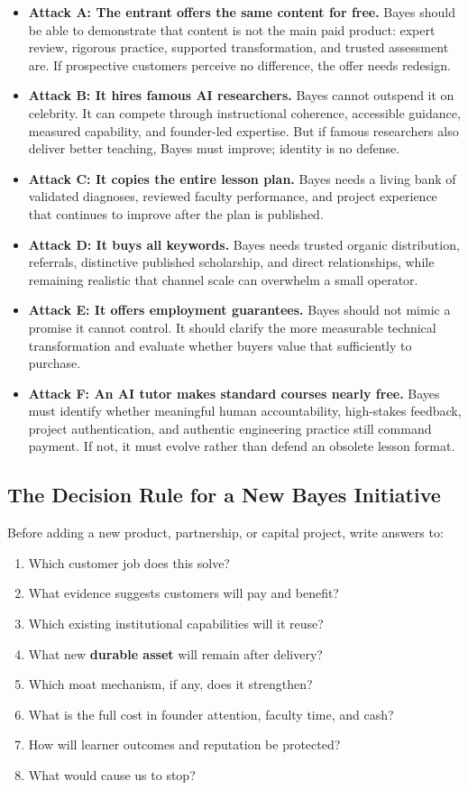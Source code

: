 \begin{itemize}
    \item \textbf{Attack A: The entrant offers the same content for free.} Bayes should be able to demonstrate that content is not the main paid product: expert review, rigorous practice, supported transformation, and trusted assessment are. If prospective customers perceive no difference, the offer needs redesign.
    \item \textbf{Attack B: It hires famous AI researchers.} Bayes cannot outspend it on celebrity. It can compete through instructional coherence, accessible guidance, measured capability, and founder-led expertise. But if famous researchers also deliver better teaching, Bayes must improve; identity is no defense.
    \item \textbf{Attack C: It copies the entire lesson plan.} Bayes needs a living bank of validated diagnoses, reviewed faculty performance, and project experience that continues to improve after the plan is published.
    \item \textbf{Attack D: It buys all keywords.} Bayes needs trusted organic distribution, referrals, distinctive published scholarship, and direct relationships, while remaining realistic that channel scale can overwhelm a small operator.
    \item \textbf{Attack E: It offers employment guarantees.} Bayes should not mimic a promise it cannot control. It should clarify the more measurable technical transformation and evaluate whether buyers value that sufficiently to purchase.
    \item \textbf{Attack F: An AI tutor makes standard courses nearly free.} Bayes must identify whether meaningful human accountability, high-stakes feedback, project authentication, and authentic engineering practice still command payment. If not, it must evolve rather than defend an obsolete lesson format.
\end{itemize}

\subsection{The Decision Rule for a New Bayes Initiative}
\label{sec:decision_rule_bayes_initiative}

Before adding a new product, partnership, or capital project, write answers to:
\begin{enumerate}
    \item Which customer job does this solve?
    \item What evidence suggests customers will pay and benefit?
    \item Which existing institutional capabilities will it reuse?
    \item What new \textbf{durable asset} will remain after delivery?
    \item Which moat mechanism, if any, does it strengthen?
    \item What is the full cost in founder attention, faculty time, and cash?
    \item How will learner outcomes and reputation be protected?
    \item What would cause us to stop?
\end{enumerate}

